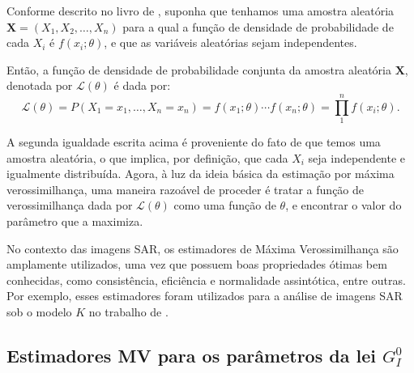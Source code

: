Conforme descrito no livro de \citet{CasellaBergerStatisticalInference}, suponha que tenhamos uma amostra aleatória \begin{math} \bm X = (X_{1}, X_{2}, \dots, X_{n}) \end{math} para a qual a função de densidade de probabilidade de cada \begin{math} X_{i} \end{math} é \begin{math} f(x_{i}; \theta)\end{math}, e que as variáveis aleatórias sejam independentes.

Então, a função de densidade de probabilidade conjunta da amostra aleatória \begin{math} \bm X \end{math}, denotada por \begin{math} \mathcal L(\theta) \end{math} é dada por:
\begin{equation}
\mathcal L(\theta) = P (X_{1} = x_{1}, \dots, X_{n} = x_{n}) =  f(x_{1}; \theta) \cdots f(x_{n}; \theta) =  \prod_{1}^{n} f(x_{i}; \theta).
\end{equation}

A segunda igualdade escrita acima é proveniente do fato de que temos uma amostra aleatória, o que implica, por definição, que cada \begin{math} X_{i} \end{math} seja independente e igualmente distribuída. Agora, à luz da ideia básica da estimação por máxima verossimilhança, uma maneira razoável de proceder é tratar a função de verossimilhança dada por \begin{math} \mathcal L (\theta) \end{math} como uma função de \begin{math} \theta \end{math}, e encontrar o valor do parâmetro que a maximiza.

No contexto das imagens SAR, os estimadores de Máxima Verossimilhança são amplamente utilizados, uma vez que possuem boas propriedades ótimas bem conhecidas, como consistência, eficiência e normalidade assintótica, entre outras. 
Por exemplo, esses estimadores foram utilizados para a análise de imagens SAR sob o modelo $K$ no trabalho de \citet{KMaxVer_Joughin}.

\subsection{Estimadores MV para os parâmetros da lei $G_I^0$}

